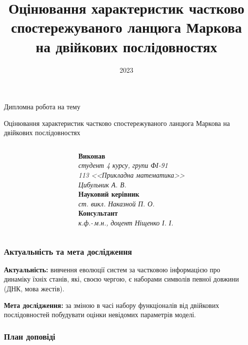 \documentclass[12pt,mathserif]{beamer}
\title{Оцінювання характеристик частково спостережуваного ланцюга Маркова на двійкових послідовностях}
\institute{НТУУ <<КПІ ім. Ігоря Сікорського>> НН ФТІ ММАД}
\date{2023}
\theoremstyle{plain}
\begin{document}
\begin{frame}
    \begin{center}
        Дипломна робота на тему
    \end{center}
    \begin{block}{}
        \centering\Large
        \vspace{3mm}
        Оцінювання характеристик частково спостережуваного ланцюга Маркова на двійкових послідовностях
        \vspace{3mm} 
    \end{block}
    \begin{columns}[t]
        \begin{column}{0.6\linewidth}
        \end{column}
        \begin{column}{0.4\linewidth}
            \scriptsize
            \textbf{Виконав} \\
            \textit{студент 4 курсу, групи ФІ-91} \\
            \textit{113 <<Прикладна математика>>} \\
            \textit{Цибульник А. В.} \\ \vspace{2mm}
            \textbf{Науковий керівник} \\
            \textit{ст. викл. Наказной П. О.} \\ \vspace{2mm}
            \textbf{Консультант} \\
            \textit{к.ф.-\,м.н., доцент Ніщенко І. І.}
        \end{column}
    \end{columns}
\end{frame}

\begin{frame}
    \frametitle{Актуальність та мета дослідження}
    \textbf{Актуальність:} вивчення еволюції систем за частковою інформацією про динаміку їхніх станів, які, своєю чергою, є наборами символів певної довжини (ДНК, мова жестів).

    \vspace{1cm}
    \textbf{Мета дослідження:} за зміною в часі набору функціоналів від двійкових послідовностей побудувати оцінки невідомих параметрів моделі.
\end{frame}

\begin{frame}
    \frametitle{План доповіді}
    \tableofcontents
\end{frame}
\end{document}

